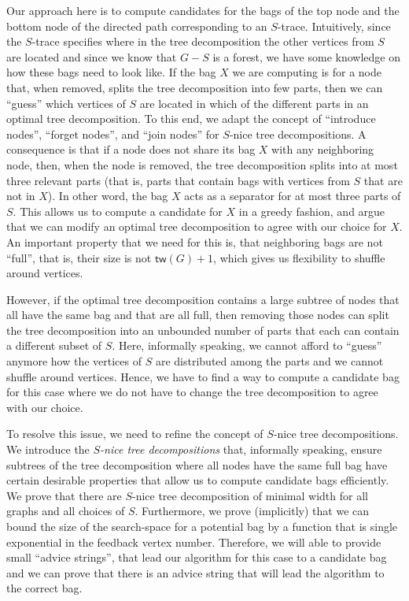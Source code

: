 \documentclass[a4paper,UKenglish,cleveref, autoref, thm-restate, numberwithinsect]{lipics-v2021}
\newcounter{algorithm}
\newcommand{\tw}{\mathsf{tw}}
\newcommand{\slim}{\text{slim}\xspace}
\begin{document}
Our approach here is to compute candidates for the bags of the top node and the bottom node of the directed path corresponding to an $S$-trace. Intuitively, since the $S$-trace specifies where in the tree decomposition the other vertices from $S$ are located and since we know that $G-S$ is a forest, we have some knowledge on how these bags need to look like. 
If the bag $X$ we are computing is for a node that, when removed, splits the tree decomposition into few parts, then we can ``guess'' which vertices of $S$ are located in which of the different parts in an optimal tree decomposition. 
To this end, we adapt the concept of ``introduce nodes'', ``forget nodes'', and ``join nodes'' for $S$-nice tree decompositions. A consequence is that if a node does not share its bag $X$ with any neighboring node, then, when the node is removed, the tree decomposition splits into at most three relevant parts (that is, parts that contain bags with vertices from $S$ that are not in $X$).
In other word, the bag $X$ acts as a separator for at most three parts of $S$.
This allows us to compute a candidate for $X$ in a greedy fashion, and argue that we can modify an optimal tree decomposition to agree with our choice for $X$. An important property that we need for this is, that neighboring bags are not ``full'', that is, their size is not $\tw(G)+1$, which gives us flexibility to shuffle around vertices.

However, if the optimal tree decomposition contains a large subtree of nodes that all have the same bag and that are all full, then removing those nodes can split the tree decomposition into an unbounded number of parts that each can contain a different subset of $S$. Here, informally speaking, we cannot afford to ``guess'' anymore how the vertices of $S$ are distributed among the parts and we cannot shuffle around vertices. Hence, we have to find a way to compute a candidate bag for this case where we do not have to change the tree decomposition to agree with our choice. 

To resolve this issue, we need to refine the concept of $S$-nice tree decompositions. We introduce the \emph{\slim $S$-nice tree decompositions} that, informally speaking, ensure subtrees of the tree decomposition where all nodes have the same full bag have certain desirable properties that allow us to compute candidate bags efficiently. We prove that there are \slim $S$-nice tree decomposition of minimal width for all graphs and all choices of $S$. Furthermore, we prove (implicitly) that we can bound the size of the search-space for a potential bag by a function that is single exponential in the feedback vertex number. 
Therefore, we will able to provide small ``advice strings'', that lead our algorithm for this case to a candidate bag and we can prove that there is an advice string that will lead the algorithm to the correct bag.
\end{document}
